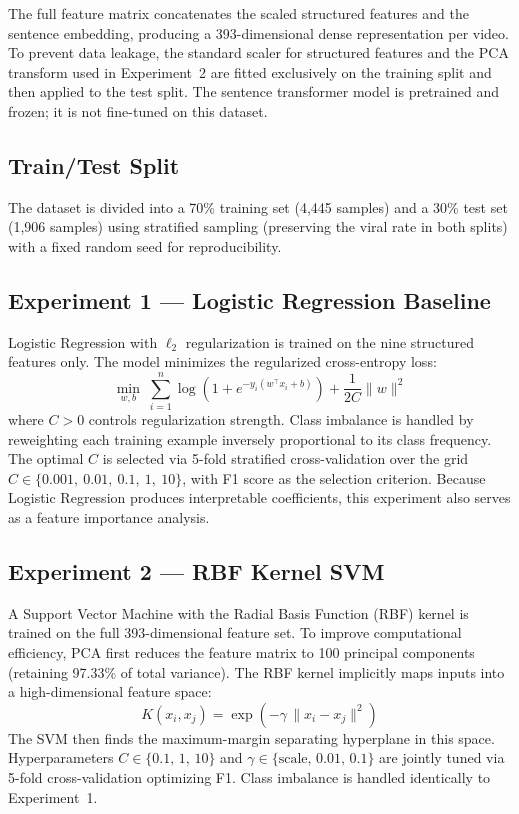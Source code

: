 \documentclass[12pt,a4paper]{article}
\begin{document}
The full feature matrix concatenates the scaled structured features and the
sentence embedding, producing a 393-dimensional dense representation per video.
To prevent data leakage, the standard scaler for structured features and the
PCA transform used in Experiment~2 are fitted exclusively on the training split
and then applied to the test split.  The sentence transformer model is
pretrained and frozen; it is not fine-tuned on this dataset.

\subsection{Train/Test Split}

The dataset is divided into a 70\% training set (4,445 samples) and a 30\%
test set (1,906 samples) using stratified sampling (preserving the viral rate
in both splits) with a fixed random seed for reproducibility.

\subsection{Experiment 1 --- Logistic Regression Baseline}
\label{sec:lr}

Logistic Regression with $\ell_2$ regularization is trained on the nine
structured features only.  The model minimizes the regularized cross-entropy
loss:
\[
  \min_{w,b} \;\sum_{i=1}^{n}
    \log\!\left(1 + e^{-y_i(w^\top x_i + b)}\right)
  + \frac{1}{2C}\|w\|^2
\]
where $C > 0$ controls regularization strength.  Class imbalance is handled by
reweighting each training example inversely proportional to its class
frequency.  The optimal $C$ is selected via 5-fold stratified cross-validation
over the grid $C \in \{0.001,\ 0.01,\ 0.1,\ 1,\ 10\}$, with F1 score as the
selection criterion.  Because Logistic Regression produces interpretable
coefficients, this experiment also serves as a feature importance analysis.

\subsection{Experiment 2 --- RBF Kernel SVM}

A Support Vector Machine with the Radial Basis Function (RBF) kernel is trained
on the full 393-dimensional feature set.  To improve computational efficiency,
PCA first reduces the feature matrix to 100 principal components (retaining
97.33\% of total variance).  The RBF kernel implicitly maps inputs into a
high-dimensional feature space:
\[
  K(x_i, x_j) = \exp\!\left(-\gamma\,\|x_i - x_j\|^2\right)
\]
The SVM then finds the maximum-margin separating hyperplane in this space.
Hyperparameters $C \in \{0.1,\,1,\,10\}$ and
$\gamma \in \{\text{scale},\,0.01,\,0.1\}$ are jointly tuned via 5-fold
cross-validation optimizing F1.  Class imbalance is handled identically to
Experiment~1.
\end{document}
